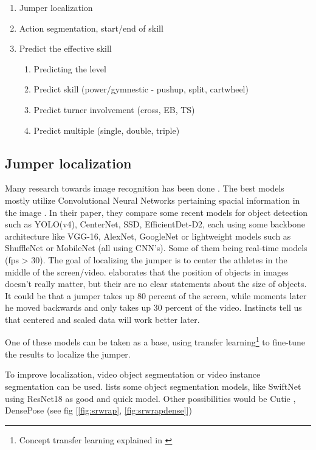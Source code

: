 \begin{enumerate}
    \item Jumper localization
    \item Action segmentation, start/end of skill
    \item Predict the effective skill
        \begin{enumerate}
            \item Predicting the level
            \item Predict skill (power/gymnestic - pushup, split, cartwheel)
            \item Predict turner involvement (cross, EB, TS)
            \item Predict multiple (single, double, triple)
        \end{enumerate}
\end{enumerate}

\subsection{Jumper localization}
\label{subsec:jumper localization}

Many research towards image recognition has been done \autocite{Zou_2023}. The best models mostly utilize Convolutional Neural Networks pertaining spacial information in the image \autocite{Zaidi_2021}. In their paper, they compare some recent models for object detection such as YOLO(v4), CenterNet, SSD, EfficientDet-D2, each using some backbone architecture like VGG-16, AlexNet, GoogleNet or lightweight models such as ShuffleNet or MobileNet (all using CNN's). Some of them being real-time models (fps > 30).
The goal of localizing the jumper is to center the athletes in the middle of the screen/video. \textcite{Bharadiya_2023} elaborates that the position of objects in images doesn't really matter, but their are no clear statements about the size of objects. It could be that a jumper takes up 80 percent of the screen, while moments later he moved backwards and only takes up 30 percent of the video. Instincts tell us that centered and scaled data will work better later.

One of these models can be taken as a base, using transfer learning\footnote{Concept transfer learning explained in \autocite{Bharadiya_2023}} to fine-tune the results to localize the jumper.

To improve localization, video object segmentation or video instance segmentation can be used. \textcite{Gao_2022} lists some object segmentation models, like SwiftNet \textcite{Wang_2021} using ResNet18 as good and quick model.
Other possibilities would be Cutie \autocite{Cheng_2023}, DensePose (see fig [\ref{fig:srwrap}, \ref{fig:srwrapdense}]) \autocite{Guler_2018}

